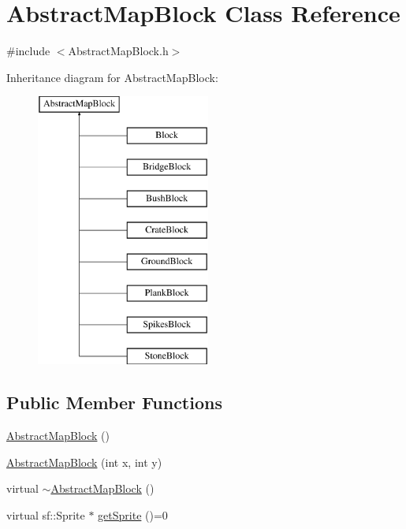 \hypertarget{class_abstract_map_block}{}\section{Abstract\+Map\+Block Class Reference}
\label{class_abstract_map_block}


{\ttfamily \#include $<$Abstract\+Map\+Block.\+h$>$}

Inheritance diagram for Abstract\+Map\+Block\+:\begin{figure}[H]
\begin{center}
\leavevmode
\includegraphics[height=9.000000cm]{class_abstract_map_block}
\end{center}
\end{figure}
\subsection*{Public Member Functions}
\begin{DoxyCompactItemize}
\item 
\hyperlink{class_abstract_map_block_ad74ee19189d5564820256e9b76bc5a3b}{Abstract\+Map\+Block} ()
\item 
\hyperlink{class_abstract_map_block_afea0f904a49f56b417387f721c8677c9}{Abstract\+Map\+Block} (int x, int y)
\item 
virtual \hyperlink{class_abstract_map_block_a1915732c2d02eb6385b6e2c007666efa}{$\sim$\+Abstract\+Map\+Block} ()
\item 
virtual sf\+::\+Sprite $\ast$ \hyperlink{class_abstract_map_block_ab5a448a1b6478d10a8814c6d19c4fdb4}{get\+Sprite} ()=0
\end{DoxyCompactItemize}
